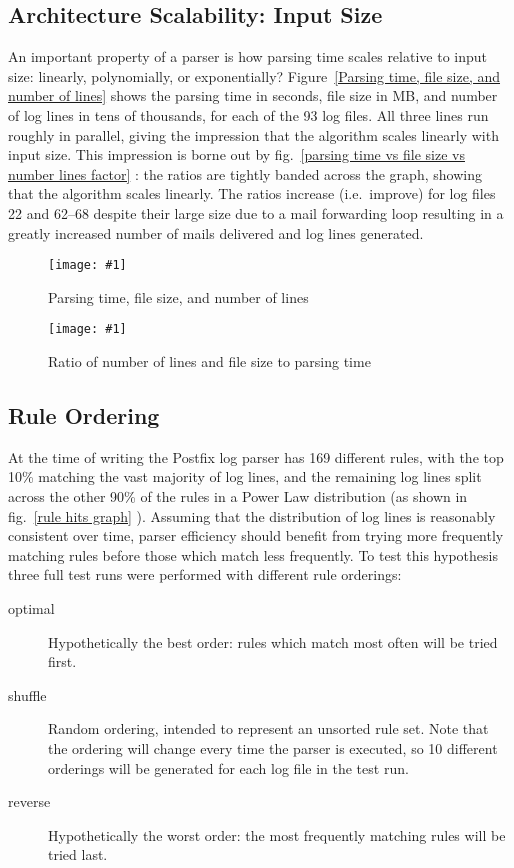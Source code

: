 \documentclass[draft]{svmult}
\newcommand{\showgraph}[3]{%
    \begin{figure}[btp]%
        \texttt{[image: \#1]}%
        \caption{#2}\label{#3}%
    \end{figure}%
}
\newcommand{\refwithlabel}[2]{%
    #1~\vref{#2}%
}
\newcommand{\graphref}[1]{%
    \refwithlabel{fig.}{#1}%
}
\newcommand{\Graphref}[1]{%
    \refwithlabel{Figure}{#1}%
}
\newcommand{\numberOFlogFILES}[0]{%
    93%
}
\newcommand{\numberOFrules}[0]{%
    169%
}
\begin{document}
\subsection{Architecture Scalability: Input Size}

An important property of a parser is how parsing time scales relative to
input size: linearly, polynomially, or exponentially?  \Graphref{Parsing
time, file size, and number of lines} shows the parsing time in seconds,
file size in MB, and number of log lines in tens of thousands, for each of
the \numberOFlogFILES{} log files.  All three lines run roughly in
parallel, giving the impression that the algorithm scales linearly with
input size.  This impression is borne out by \graphref{parsing time vs file
size vs number lines factor}: the ratios are tightly banded across the
graph, showing that the algorithm scales linearly.  The ratios increase
(i.e.\ improve) for log files 22 and 62--68 despite their large size due to
a mail forwarding loop resulting in a greatly increased number of mails
delivered and log lines generated.

\showgraph{build/graph-input-size-vs-parsing-time}{Parsing time, file size,
and number of lines}{Parsing time, file size, and number of lines}
\showgraph{build/graph-input-size-vs-parsing-time-ratio}{Ratio of number of
lines and file size to parsing time}{parsing time vs file size vs number
lines factor}

\subsection{Rule Ordering}

\label{Rule ordering}

At the time of writing the Postfix log parser has \numberOFrules{} different rules, with the
top 10\% matching the vast majority of log lines, and the remaining log
lines split across the other 90\% of the rules in a Power Law distribution
(as shown in \graphref{rule hits graph}).  Assuming that the distribution
of log lines is reasonably consistent over time, parser efficiency should
benefit from trying more frequently matching rules before those which match
less frequently.  To test this hypothesis three full test runs were
performed with different rule orderings:

\begin{description}

    \item [optimal]  Hypothetically the best order: rules which match most
        often will be tried first.

    \item [shuffle] Random ordering, intended to represent an unsorted rule
        set.  Note that the ordering will change every time the parser is
        executed, so 10 different orderings will be generated for each log
        file in the test run.

    \item [reverse] Hypothetically the worst order: the most frequently
        matching rules will be tried last.

\end{description}
\end{document}
